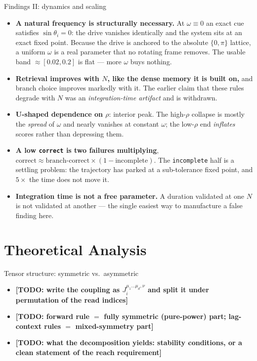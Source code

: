 \documentclass[aspectratio=169]{beamer}
\newcommand{\thetavar}{\theta}
\newcommand{\TODO}[1]{{\color{red}\textbf{[TODO: #1]}}}
\begin{document}
\begin{frame}{Findings II: dynamics and scaling}
  \begin{itemize}\small
    \item \textbf{A natural frequency is structurally necessary.} At $\omega \equiv 0$ an exact
      cue satisfies $\sin\thetavar_i = 0$: the drive vanishes identically and the system sits at
      an exact fixed point. Because the drive is anchored to the absolute $\{0,\pi\}$ lattice, a
      uniform $\omega$ is a real parameter that no rotating frame removes. The usable band
      $\approx [0.02,0.2]$ is flat --- more $\omega$ buys nothing.
    \item \textbf{Retrieval improves with $N$, like the dense memory it is built on,} and
      branch choice improves markedly with it. The earlier claim that these rules degrade with
      $N$ was an \emph{integration-time artifact} and is withdrawn.
    \item \textbf{U-shaped dependence on $\rho$}: interior peak. The
      high-$\rho$ collapse is mostly the \emph{spread} of $\omega$ and nearly vanishes at
      constant $\omega$; the low-$\rho$ end \emph{inflates} scores rather than depressing them.
    \item \textbf{A low \texttt{correct} is two failures multiplying},
      $\text{correct} \approx \text{branch-correct}\times(1-\text{incomplete})$. The
      \texttt{incomplete} half is a settling problem: the trajectory has parked at a
      sub-tolerance fixed point, and $5\times$ the time does not move it.
    \item \textbf{Integration time is not a free parameter.} A duration validated at one $N$ is
      not validated at another --- the single easiest way to manufacture a false finding here.
  \end{itemize}
\end{frame}


\section[Analysis]{Theoretical Analysis}

\begin{frame}{Tensor structure: symmetric vs.\ asymmetric}
  \begin{itemize}
    \item \TODO{write the coupling as $J_i^{\mu_1\dots\mu_d,\nu}$ and split
      it under permutation of the read indices}
    \item \TODO{forward rule $=$ fully symmetric (pure-power) part;
      lag-context rules $=$ mixed-symmetry part}
    \item \TODO{what the decomposition yields: stability conditions, or a
      clean statement of the reach requirement}
  \end{itemize}
\end{frame}
\end{document}
